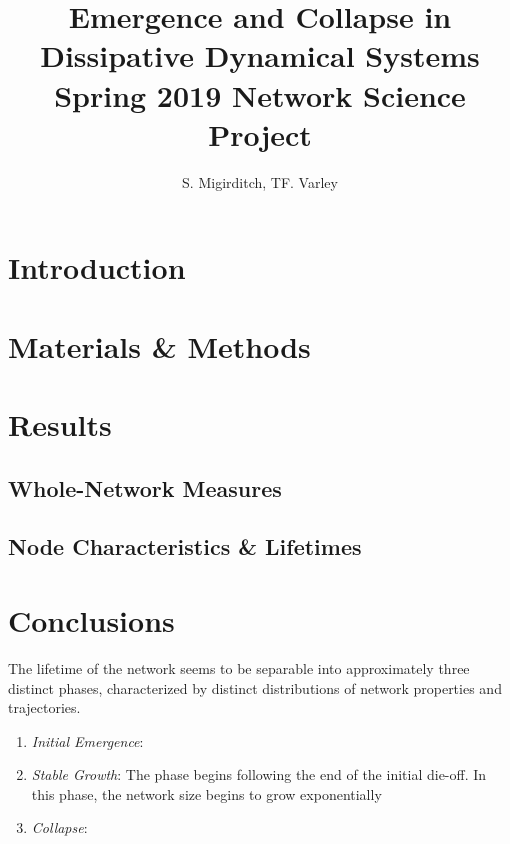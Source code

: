 \documentclass{paper}
\title{Emergence and Collapse in Dissipative Dynamical Systems \\ \textnormal{Spring 2019 Network Science Project}}
\author{S. Migirditch, TF. Varley}
\begin{document}
	\maketitle
	
	\section{Introduction}
	
	\section{Materials \& Methods}
	
	\section{Results}
	\subsection{Whole-Network Measures}
	\subsection{Node Characteristics \& Lifetimes}
	
	\section{Conclusions}
	
	The lifetime of the network seems to be separable into approximately three distinct phases, characterized by distinct distributions of network properties and trajectories. 
	\begin{enumerate}
		\item \textit{Initial Emergence}:
		\item \textit{Stable Growth}: The phase begins following the end of the initial die-off. In this phase, the network size begins to grow exponentially
		\item \textit{Collapse}:
	\end{enumerate}
	
	
	
\end{document}
